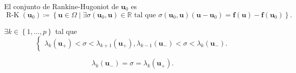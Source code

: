\begin{definition}
	El conjunto de Rankine-Hugoniot de $\symbf{u}_{0}$ es
	\begin{equation*}
		\operatorname{R-K}\left(\symbf{u}_{0}\right)\coloneqq
		\left\{
		\symbf{u}\in\Omega\mid\exists\sigma\left(\symbf{u}_{0},\symbf{u}\right)\in\mathbb{R}\text{ tal que }
		\sigma\left(\symbf{u}_{0},\symbf{u}\right)\left(\symbf{u}-\symbf{u}_{0}\right)=
		\symbf{f}\left(\symbf{u}\right)-\symbf{f}\left(\symbf{u}_{0}\right)
		\right\}.
	\end{equation*}
\end{definition}

\begin{definition}
	$\exists k\in\left\{1,\dotsc,p\right\}$ tal que
	\begin{equation*}
		\begin{cases}
			\lambda_{k}\left(\symbf{u}_{+}\right)<\sigma<\lambda_{k+1}\left(\symbf{u}_{+}\right),
			\lambda_{k-1}\left(\symbf{u}_{-}\right)<\sigma<\lambda_{k}\left(\symbf{u}_{-}\right).
		\end{cases}
	\end{equation*}

	\begin{equation*}
		\lambda_{k}\left(\symbf{u}_{-}\right)=\sigma=\lambda_{k}\left(\symbf{u}_{+}\right).
	\end{equation*}
\end{definition}
